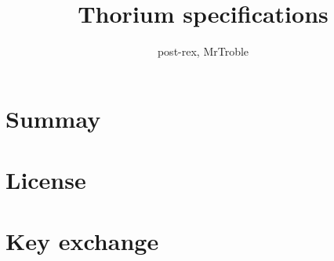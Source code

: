 \documentclass[10pt,a4paper]{article}
\begin{document}
\title{Thorium specifications}
\author{post-rex, MrTroble}
\maketitle
\newpage
\section{Summay}

\section{License}

\section{Key exchange}

\end{document}
